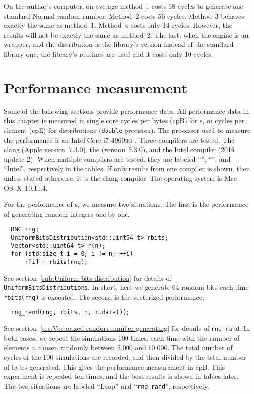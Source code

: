 On the author's computer, on average method~1 costs 68 cycles to generate one
standard Normal random number. Method~2 costs 56 cycles. Method~3 behaves
exactly the same as method~1. Method~4 costs only 14 cycles. However, the
results will not be exactly the same as method~2. The last, when the \rng{}
engine is an \mkl{} \rng wrapper, and the distribution is the library's version
instead of the standard library one, the \mkl library's routines are used and
it costs only 10 cycles.

\section{Performance measurement}
\label{sec:Performance measurement}

Some of the following sections provide performance data. All performance data
in this chapter is measured in single core cycles per bytes (cpB) for \rng{}s,
or cycles per element (cpE) for distributions (\verb|double| precision). The
processor used to measure the performance is an Intel Core i7-4960\textsc{hg}
\cpu. Three compilers are tested. The \llvm clang (Apple version~7.3.0), the
\gnu{} \gcc (version~5.3.0), and the Intel \cpp compiler (2016 update 2). When
multiple compilers are tested, they are labeled ``\llvm'', ``\gnu'', and
``Intel'', respectively in the tables. If only results from one compiler is
shown, then unless stated otherwise, it is the \llvm clang compiler. The
operating system is Mac OS~X~10.11.4.

For the performance of \rng{}s, we measure two situations. The first is the
performance of generating random integers one by one,
\begin{Verbatim}
  RNG rng;
  UniformBitsDistribution<std::uint64_t> rbits;
  Vector<std::uint64_t> r(n);
  for (std:size_t i = 0; i != n; ++i)
      r[i] = rbits(rng);
\end{Verbatim}
See section~\ref{sub:Uniform bits distribution} for details of
\verb|UniformBitsDistributions|. In short, here we generate 64 random bits each
time \verb|rbits(rng)| is executed. The second is the vectorized performance,
\begin{Verbatim}
  rng_rand(rng, rbits, n, r.data());
\end{Verbatim}
See section~\ref{sec:Vectorized random number generating} for details of
\verb|rng_rand|. In both cases, we repeat the simulations 100 times, each time
with the number of elements $n$ chosen randomly between 5,000 and 10,000. The
total number of cycles of the 100 simulations are recorded, and then divided by
the total number of bytes generated. This gives the performance measurement in
cpB. This experiment is repeated ten times, and the best results is shown in
tables later. The two situations are labeled ``Loop'' and ``\verb|rng_rand|'',
respectively.

